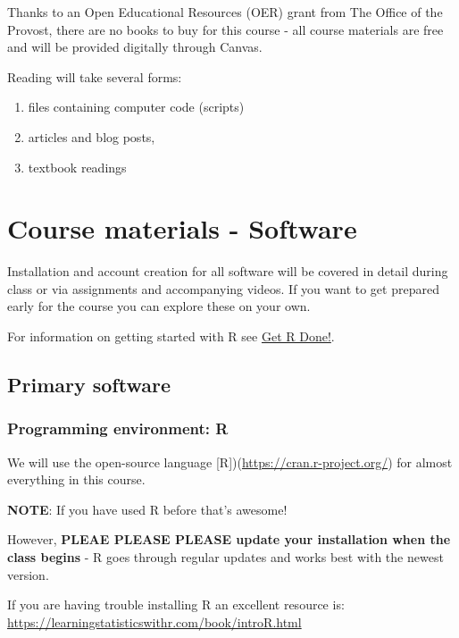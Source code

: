 \documentclass[
]{book}
\providecommand{\tightlist}{%
  \setlength{\itemsep}{0pt}\setlength{\parskip}{0pt}}
\begin{document}
Thanks to an Open Educational Resources (OER) grant from The Office of the Provost, there are no books to buy for this course - all course materials are free and will be provided digitally through Canvas.

Reading will take several forms:

\begin{enumerate}
\def\labelenumi{\arabic{enumi}.}
\tightlist
\item
  files containing computer code (scripts)
\item
  articles and blog posts,
\item
  textbook readings
\end{enumerate}

\hypertarget{course-materials---software}{%
\chapter{Course materials - Software}\label{course-materials---software}}

Installation and account creation for all software will be covered in detail during class or via assignments and accompanying videos. If you want to get prepared early for the course you can explore these on your own.

For information on getting started with R see \href{https://brouwern.github.io/getRdone/}{Get R Done!}.

\hypertarget{primary-software}{%
\section{Primary software}\label{primary-software}}

\hypertarget{programming-environment-r}{%
\subsection{Programming environment: R}\label{programming-environment-r}}

We will use the open-source language {[}R{]})(\url{https://cran.r-project.org/}) for almost everything in this course.

\textbf{NOTE}: If you have used R before that's awesome!

However, \textbf{PLEAE PLEASE PLEASE update your installation when the class begins} - R goes through regular updates and works best with the newest version.

If you are having trouble installing R an excellent resource is:
\url{https://learningstatisticswithr.com/book/introR.html}
\end{document}
